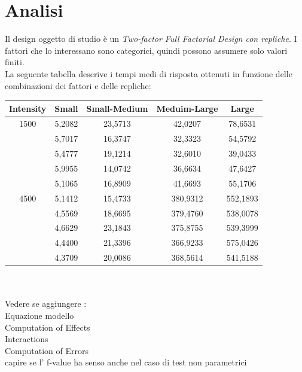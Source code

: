\section{Analisi}
Il design oggetto di studio è un \textit{Two-factor Full Factorial Design con repliche}.
I fattori che lo interessano sono categorici, quindi possono assumere solo valori finiti. 
\\La seguente tabella descrive i tempi medi di risposta ottenuti in funzione delle combinazioni dei fattori e delle repliche:
\\
\begin{table}[h]
	\begin{center}
		\begin{tabular}{|c|c|c|c|c|}
			\hline
			Intensity & Small & Small-Medium & Meduim-Large & Large\\
			\hline
			\rule[-4mm]{0mm}{0.5cm}
			1500 & 5,2082 & 23,5713 & 42,0207 & 78,6531\\
			\rule[-4mm]{0mm}{0.5cm}
			& 5,7017 & 16,3747 & 32,3323 & 54,5792\\
			\rule[-4mm]{0mm}{0.5cm}
			& 5,4777 & 19,1214 & 32,6010 & 39,0433\\
			\rule[-4mm]{0mm}{0.5cm}
			& 5,9955 & 14,0742 & 36,6634 & 47,6427\\	
			\rule[-4mm]{0mm}{0.5cm}
			& 5,1065 & 16,8909 & 41,6693 & 55,1706\\ 
			\hline
			\rule[-0.5cm]{0mm}{0.5cm}
			4500 & 5,1412 & 15,4733 & 380,9312 & 552,1893\\
			\rule[-0.5cm]{0mm}{0.5cm}
			& 4,5569 & 18,6695 & 379,4760 & 538,0078\\
			\rule[-0.5cm]{0mm}{0.5cm}
			& 4,6629 & 23,1843 & 375,8755 & 539,3999\\
			\rule[-0.5cm]{0mm}{0.5cm}
			& 4,4400 & 21,3396 & 366,9233 & 575,0426\\	
			\rule[-0.5cm]{0mm}{0.5cm}
			& 4,3709 & 20,0086 & 368,5614 & 541,5188\\
			\hline
		\end{tabular}
	\end{center}
\end{table}
\\
\\
Vedere se aggiungere :
\\Equazione modello
\\Computation of Effects
\\Interactions
\\Computation of Errors
\\capire se l' f-value ha senso anche nel caso di test non parametrici
